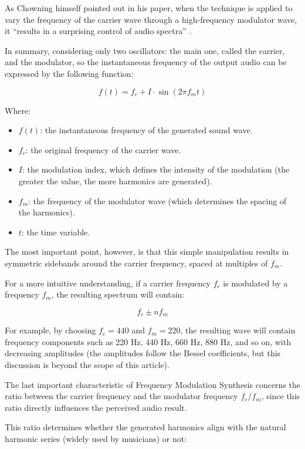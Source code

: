 As Chowning himself pointed out in his paper, when the technique is applied to vary the frequency of the carrier wave through a high-frequency modulator wave, it “results in a surprising control of audio spectra” \cite{chowning1973synthesis}.

In summary, considering only two oscillators: the main one, called the carrier, and the modulator, so the instantaneous frequency of the output audio can be expressed by the following function:

\[
    f(t) = f_c + I \cdot \sin(2\pi f_m t)
\]

Where:

\begin{itemize}
    \item \( f(t) \): the instantaneous frequency of the generated sound wave.
    \item \( f_c \): the original frequency of the carrier wave.
    \item \( I \): the modulation index, which defines the intensity of the modulation (the greater the value, the more harmonics are generated).
    \item \( f_m \): the frequency of the modulator wave (which determines the spacing of the harmonics).
    \item \( t \): the time variable.
\end{itemize}

The most important point, however, is that this simple manipulation results in symmetric sidebands around the carrier frequency, spaced at multiples of \( f_m \).

For a more intuitive understanding, if a carrier frequency \( f_c \) is modulated by a frequency \( f_m \), the resulting spectrum will contain:

\[
    f_c \pm n f_m
\]

For example, by choosing \( f_c = 440 \) and \( f_m = 220 \), the resulting wave will contain frequency components such as 220 Hz, 440 Hz, 660 Hz, 880 Hz, and so on, with decreasing amplitudes (the amplitudes follow the Bessel coefficients, but this discussion is beyond the scope of this article).

The last important characteristic of Frequency Modulation Synthesis concerns the ratio between the carrier frequency and the modulator frequency \( f_c / f_m \), since this ratio directly influences the perceived audio result.

This ratio determines whether the generated harmonics align with the natural harmonic series (widely used by musicians) or not:

